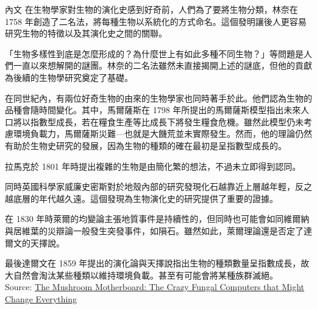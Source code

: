 \documentclass{article}
\begin{document}
\begin{boxpar}{內文}
在生物學家對生物的演化史感到好奇前，人們為了要將生物分類，林奈在 1758 年創造了二名法，將每種生物以系統化的方式命名。這個發明讓後人更容易研究生物的特徵以及其演化史之間的關聯。

「生物多樣性到底是怎麼形成的？為什麼世上有如此多種不同生物？」等問題是人們一直以來想解開的謎團。林奈的二名法雖然未直接揭開上述的謎底，但他的貢獻為後續的生物學研究奠定了基礎。

在同世紀內，有兩位好奇生物的由來的生物學家也同時著手於此。他們認為生物的品種會隨時間變化。其中，馬爾薩斯在 1798 年所提出的馬爾薩斯模型指出未來人口將以指數型成長，若在糧食生產等比成長下將發生糧食危機。雖然此模型仍未考慮環境負載力，馬爾薩斯災難—也就是大饑荒並未實際發生。然而，他的理論仍然有助於生物史研究的發展，因為生物的種類的確在最初是呈指數型成長的。

拉馬克於 1801 年時提出複雜的生物是由簡化繁的想法，不過未立即得到認同。

同時英國科學家威廉史密斯對於地殼內部的研究發現化石越靠近上層越年輕，反之越底層的年代越久遠。這個發現為生物演化史的研究提供了重要的證據。

在 1830 年時萊爾的均變論主張地質事件是持續性的，但同時也可能會如同維爾納與居維葉的災辯論一般發生突發事件，如隕石。雖然如此，萊爾理論還是否定了達爾文的天擇說。

最後達爾文在 1859
    年提出的演化論與天擇說指出生物的種類數量呈指數成長，故大自然會淘汰某些種類以維持環境負載。甚至有可能會將某種族群滅絕。\\
Source: \href{https://www.youtube.com/watch?v=5mIWo6dgTmI}{The Mushroom Motherboard: The Crazy Fungal Computers that Might Change Everything}
\end{boxpar}
\end{document}
